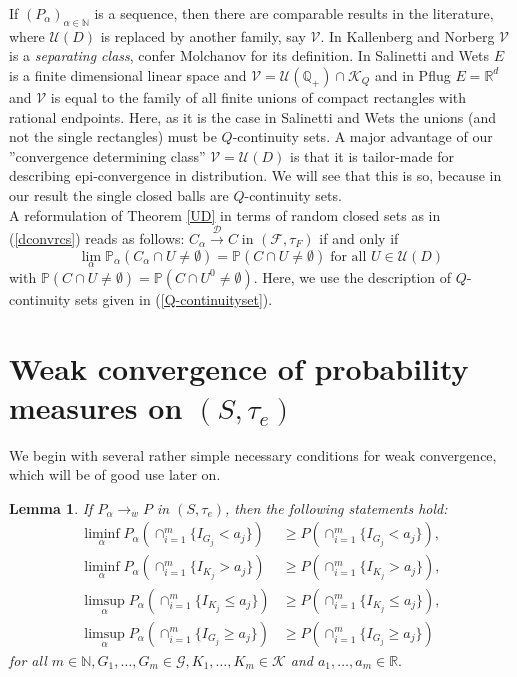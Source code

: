 \documentclass[sn-mathphys,Numbered]{sn-jnl}%
\theoremstyle{thmstyleone}%
\theoremstyle{thmstyletwo}%
\newtheorem{lemma}{Lemma}%
\theoremstyle{thmstylethree}%
\begin{document}
If $(P_\alpha)_{\alpha \in \mathbb{N}}$ is a sequence, then there are comparable results in the literature, where $\mathcal{U}(D)$ is replaced
by another family, say $\mathcal{V}$. In Kallenberg \cite{Kall} and Norberg \cite{Norberg} $\mathcal{V}$  is a \emph{separating class}, confer Molchanov \cite{Molchanov} for its definition. In Salinetti
and Wets \cite{SalWe} $E$ is a finite dimensional linear space and $\mathcal{V}=\mathcal{U}(\mathbb{Q}_+) \cap \mathcal{K}_Q$ and in Pflug \cite{Pflug} $E=\mathbb{R}^d$ and $\mathcal{V}$ is equal to the family of all finite unions of compact rectangles with rational endpoints. Here, as it is the case in Salinetti and Wets \cite{SalWe} the unions (and not the single rectangles) must be $Q$-continuity sets.
A major advantage of our ''convergence determining class'' $\mathcal{V}=\mathcal{U}(D)$ is that it is tailor-made for describing epi-convergence in distribution. We will see that this is so, because in our result the single closed balls are $Q$-continuity sets.\\

A reformulation of Theorem \ref{UD} in terms of random closed sets as in (\ref{dconvrcs}) reads as follows:
$C_\alpha \stackrel{\mathcal{D}}{\longrightarrow} C \; \text{in } (\mathcal{F},\tau_F)$ if and only if
$$
 \lim_\alpha \mathbb{P}_\alpha(C_\alpha \cap U \neq \emptyset) = \mathbb{P}(C \cap U \neq \emptyset) \; \text{for all } U \in \mathcal{U}(D)
$$
with $\mathbb{P}(C \cap U \neq \emptyset)= \mathbb{P}(C \cap U^0 \neq \emptyset).$
Here, we use the description of $Q$-continuity sets given in (\ref{Q-continuityset}).

\section{Weak convergence of probability measures on $(S,\tau_e)$}
We begin with several rather simple necessary conditions for weak convergence, which will be of good use later on.\\

\begin{lemma} If $P_\alpha \rightarrow_w P$ in $(S,\tau_e)$, then the following statements hold:
\begin{align}
\liminf_\alpha P_\alpha (\cap_{i=1}^m \{I_{G_j} < a_j\})
    &\ge P(\cap_{i=1}^m \{I_{G_j} < a_j\}), \label{liminfG}\\
\liminf_\alpha P_\alpha(\cap_{i=1}^m \{I_{K_j} > a_j\})
    &\ge P(\cap_{i=1}^m \{I_{K_j} > a_j\}), \label{liminfK} \\
\limsup_\alpha P_\alpha(\cap_{i=1}^m \{I_{K_j} \le a_j\})
    &\ge P(\cap_{i=1}^m \{I_{K_j} \le a_j\}), \label{limsupK}\\
\limsup_\alpha P_\alpha(\cap_{i=1}^m \{I_{G_j} \ge a_j\})
    &\ge P(\cap_{i=1}^m \{I_{G_j} \ge a_j\}) \label{limsupG}
\end{align}
for all $m \in \mathbb{N}, G_1,\ldots,G_m \in \mathcal{G}, K_1,\ldots,K_m \in \mathcal{K}$ and $a_1,\ldots,a_m \in \mathbb{R}.$
\end{lemma}
\end{document}
